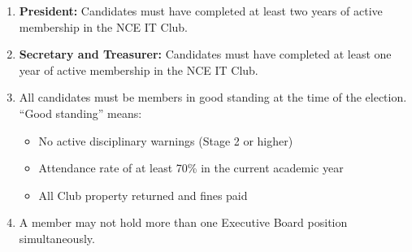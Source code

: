 
\begin{enumerate}[label=\alph*), leftmargin=2em, itemsep=0.3em]
    \item \textbf{President:} Candidates must have completed at least two years of active membership in the NCE IT Club.
    
    \item \textbf{Secretary and Treasurer:} Candidates must have completed at least one year of active membership in the NCE IT Club.
    
    \item All candidates must be members in good standing at the time of the election. ``Good standing'' means:
    \begin{itemize}[leftmargin=1.5em, itemsep=0.2em]
        \item No active disciplinary warnings (Stage 2 or higher)
        \item Attendance rate of at least 70\% in the current academic year
        \item All Club property returned and fines paid
    \end{itemize}
    
    \item A member may not hold more than one Executive Board position simultaneously.
\end{enumerate}

